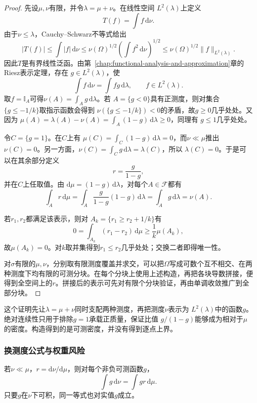 \begin{proof}
先设\(\mu,\nu\)有限，并令\(\lambda=\mu+\nu\)。在线性空间
\(L^2(\lambda)\)上定义
\[
  T(f)=\int f\,\mathrm{d}\nu.
\]
由于\(\nu\leq\lambda\)，Cauchy--Schwarz不等式给出
\[
  |T(f)|
  \leq\int|f|\,\mathrm{d}\nu
  \leq\nu(\Omega)^{1/2}
       \left(\int f^2\,\mathrm{d}\nu\right)^{1/2}
  \leq\nu(\Omega)^{1/2}\lVert f\rVert_{L^2(\lambda)}.
\]
因此\(T\)是有界线性泛函。由第~\ref{chap:functional-analysis-and-approximation}章的Riesz表示定理，存在
\(g\in L^2(\lambda)\)，使
\[
  \int f\,\mathrm{d}\nu=\int fg\,\mathrm{d}\lambda,
  \qquad f\in L^2(\lambda).
\]
取\(f=\mathbb{I}_A\)可得\(\nu(A)=\int_Ag\,\mathrm{d}\lambda\)。若
\(A=\{g<0\}\)具有正测度，则对集合\(\{g\leq-1/k\}\)取指示函数会得到
\(\nu(\{g\leq-1/k\})<0\)的矛盾，故\(g\geq0\)几乎处处。又因为
\(\mu(A)=\lambda(A)-\nu(A)=\int_A(1-g)\,\mathrm{d}\lambda\geq0\)，同理有
\(g\leq1\)几乎处处。

令\(C=\{g=1\}\)。在\(C\)上有
\(\mu(C)=\int_C(1-g)\,\mathrm{d}\lambda=0\)，而\(\nu\ll\mu\)推出
\(\nu(C)=0\)。另一方面，\(\nu(C)=\int_Cg\,\mathrm{d}\lambda=\lambda(C)\)，所以
\(\lambda(C)=0\)。于是可以在其余部分定义
\[
  r=\frac{g}{1-g},
\]
并在\(C\)上任取值。由
\(\mathrm{d}\mu=(1-g)\,\mathrm{d}\lambda\)，对每个\(A\in\mathcal{F}\)都有
\[
  \int_A r\,\mathrm{d}\mu
  =\int_A\frac{g}{1-g}(1-g)\,\mathrm{d}\lambda
  =\int_Ag\,\mathrm{d}\lambda
  =\nu(A).
\]

若\(r_1,r_2\)都满足该表示，则对
\(A_k=\{r_1\geq r_2+1/k\}\)有
\[
  0=\int_{A_k}(r_1-r_2)\,\mathrm{d}\mu
  \geq\frac{1}{k}\mu(A_k),
\]
故\(\mu(A_k)=0\)。对\(k\)取并集得到\(r_1\leq r_2\)几乎处处；交换二者即得唯一性。

对\(\sigma\)有限的\(\mu,\nu\)，分别取有限测度覆盖并求交，可以把\(\Omega\)写成可数个互不相交、在两种测度下均有限的可测分块。在每个分块上使用上述构造，再把各块导数拼接，便得到全空间上的\(r\)。拼接后的表示可先对有限个分块验证，再由单调收敛推广到全部分块。
\end{proof}

这个证明先让\(\lambda=\mu+\nu\)同时支配两种测度，再把测度\(\nu\)表示为
\(L^2(\lambda)\)中的函数\(g\)。绝对连续性只用于排除\(g=1\)承载正质量，保证比值
\(g/(1-g)\)能够成为相对于\(\mu\)的密度。构造得到的是可测密度，并没有得到逐点上界。

\subsubsection{换测度公式与权重风险}

\begin{theorem}[换测度积分公式]
\label{thm:probability-change-measure-integral}
若\(\nu\ll\mu\)，\(r=\mathrm{d}\nu/\mathrm{d}\mu\)，则对每个非负可测函数\(g\)，
\[ \int g\,\mathrm{d}\nu
  =\int gr\,\mathrm{d}\mu. \]
只要\(g\)在\(\nu\)下可积，同一等式也对实值\(g\)成立。
\end{theorem}


